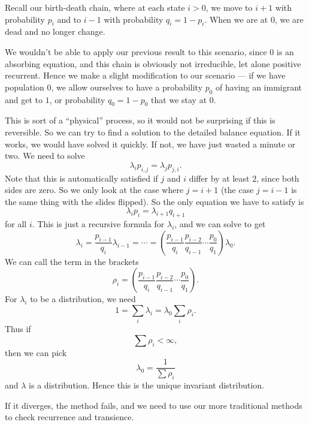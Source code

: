 \documentclass[a4paper]{article}
\begin{document}
\begin{eg}
  Recall our birth-death chain, where at each state $i > 0$, we move to $i + 1$ with probability $p_i$ and to $i - 1$ with probability $q_i = 1 - p_i$. When we are at $0$, we are dead and no longer change.

  We wouldn't be able to apply our previous result to this scenario, since $0$ is an absorbing equation, and this chain is obviously not irreducible, let alone positive recurrent. Hence we make a slight modification to our scenario --- if we have population $0$, we allow ourselves to have a probability $p_0$ of having an immigrant and get to $1$, or probability $q_0 = 1 - p_0$ that we stay at $0$.

  This is sort of a ``physical'' process, so it would not be surprising if this is reversible. So we can try to find a solution to the detailed balance equation. If it works, we would have solved it quickly. If not, we have just wasted a minute or two. We need to solve
  \[
    \lambda_i p_{i, j} = \lambda_j p_{j, i}.
  \]
  Note that this is automatically satisfied if $j$ and $i$ differ by at least $2$, since both sides are zero. So we only look at the case where $j = i + 1$ (the case $j = i - 1$ is the same thing with the slides flipped). So the only equation we have to satisfy is
  \[
    \lambda_i p_i = \lambda_{i + 1}q_{i + 1}
  \]
  for all $i$. This is just a recursive formula for $\lambda_i$, and we can solve to get
  \[
    \lambda_i = \frac{p_{i - 1}}{q_i} \lambda_{i - 1} = \cdots = \left(\frac{p_{i - 1}}{q_i} \frac{p_{i - 2}}{q_{i - 1}} \cdots \frac{p_0}{q_1}\right)\lambda_0.
  \]
  We can call the term in the brackets
  \[
    \rho_i = \left(\frac{p_{i - 1}}{q_i} \frac{p_{i - 2}}{q_{i - 1}} \cdots \frac{p_0}{q_1}\right).
  \]
  For $\lambda_i$ to be a distribution, we need
  \[
    1 = \sum_i \lambda_i = \lambda_0 \sum_i \rho_i.
  \]
  Thus if
  \[
    \sum \rho_i < \infty,
  \]
  then we can pick
  \[
    \lambda_0 = \frac{1}{\sum \rho_i}
  \]
  and $\lambda$ is a distribution. Hence this is the unique invariant distribution.

  If it diverges, the method fails, and we need to use our more traditional methods to check recurrence and transience.
\end{eg}
\end{document}
